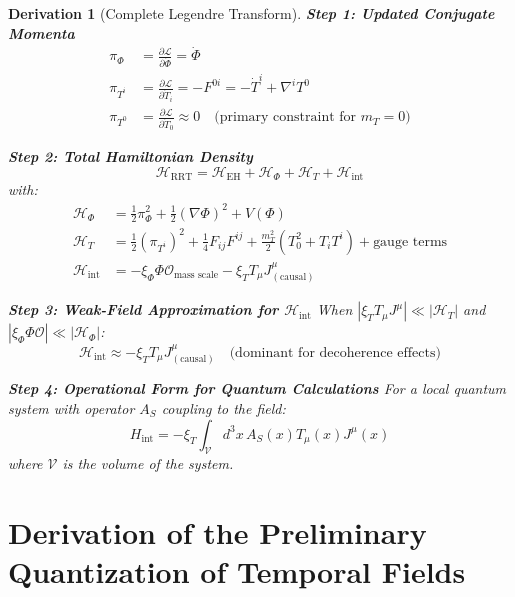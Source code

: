 \documentclass[10pt, a4paper]{article}
\newcommand{\Lagrange}{\mathscr{L}}
\newcommand{\Hamil}{\mathcal{H}}
\newcommand{\xiphi}{\xi_\Phi}  %
\newcommand{\xiT}{\xi_T}       %
\newtheorem{derivation}{Derivation}
\begin{document}
\begin{derivation}[Complete Legendre Transform]
\textbf{Step 1: Updated Conjugate Momenta}
\begin{align}
\pi_\Phi &= \frac{\partial \Lagrange}{\partial \dot{\Phi}} = \dot{\Phi}
\tag{6.1} \\
\pi_{T^i} &= \frac{\partial \Lagrange}{\partial \dot{T}_i} = -F^{0i} = -\dot{T}^i + \nabla^i T^0
\tag{6.2} \\
\pi_{T^0} &= \frac{\partial \Lagrange}{\partial \dot{T}_0} \approx 0 \quad \text{(primary constraint for $m_T=0$)}
\tag{6.3}
\end{align}

\textbf{Step 2: Total Hamiltonian Density}
\begin{equation}
\Hamil_{\text{RRT}} = \Hamil_{\text{EH}} + \Hamil_\Phi + \Hamil_T + \Hamil_{\text{int}}
\tag{6.4}
\end{equation}
with:
\begin{align}
\Hamil_\Phi &= \frac{1}{2} \pi_\Phi^2 + \frac{1}{2} (\nabla \Phi)^2 + V(\Phi)
\tag{6.5} \\
\Hamil_T &= \frac{1}{2} (\pi_{T^i})^2 + \frac{1}{4} F_{ij} F^{ij} + \frac{m_T^2}{2} (T_0^2 + T_i T^i) + \text{gauge terms}
\tag{6.6} \\
\Hamil_{\text{int}} &= -\xiphi \Phi \mathscr{O}_{\text{mass scale}} - \xiT T_\mu J^\mu_{(\text{causal})}
\tag{6.7}
\end{align}

\textbf{Step 3: Weak-Field Approximation for $\Hamil_{\text{int}}$}
When $|\xiT T_\mu J^\mu| \ll |\Hamil_T|$ and $|\xiphi \Phi \mathscr{O}| \ll |\Hamil_\Phi|$:
\begin{equation}
\Hamil_{\text{int}} \approx -\xiT T_\mu J^\mu_{(\text{causal})} \quad \text{(dominant for decoherence effects)}
\tag{6.8}
\end{equation}

\textbf{Step 4: Operational Form for Quantum Calculations}
For a local quantum system with operator $A_S$ coupling to the field:
\begin{equation}
H_{\text{int}} = -\xiT \int_{\mathcal{V}} d^3x \, A_S(x) T_\mu(x) J^\mu(x)
\tag{6.9}
\end{equation}
where $\mathcal{V}$ is the volume of the system.
\end{derivation}

\section{Derivation of the Preliminary Quantization of Temporal Fields}
\end{document}
